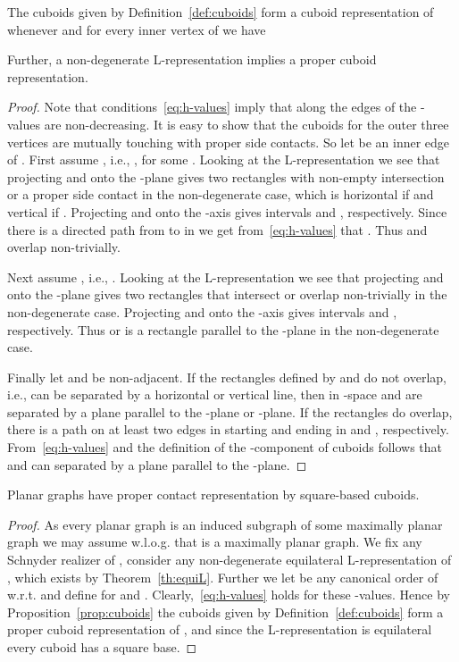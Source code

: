 \documentclass{llncs}
\begin{document}
\begin{proposition}\label{prop:cuboids}
 The cuboids given by Definition~\ref{def:cuboids} form a cuboid representation of  whenever  and for every inner vertex  of  we have
 
Further, a non-degenerate L-representation implies a proper cuboid representation.
\end{proposition}

\begin{proof}
Note that conditions~\eqref{eq:h-values} imply that along the edges of  the -values are non-decreasing.
It is easy to show that the cuboids for the outer three vertices are mutually touching with proper side contacts. So let  be an inner edge of . First assume , i.e., , for some . Looking at the L-representation we see that projecting  and  onto the -plane gives two rectangles with non-empty intersection or a proper side contact in the non-degenerate case, which is horizontal if  and vertical if . Projecting  and  onto the -axis gives intervals  and , respectively. Since there is a directed path from  to  in  we get from~\eqref{eq:h-values} that . Thus  and  overlap non-trivially.
 
 Next assume , i.e., . Looking at the L-representation we see that projecting  and  onto the -plane gives two rectangles that intersect or overlap non-trivially in the non-degenerate case. Projecting  and  onto the -axis gives intervals  and , respectively. Thus  or is a rectangle parallel to the -plane in the non-degenerate case.
  
 Finally let  and  be non-adjacent. If the rectangles defined by  and  do not overlap, i.e., can be separated by a horizontal or vertical line, then in -space  and  are separated by a plane parallel to the -plane or -plane. If the rectangles do overlap, there is a path on at least two edges in  starting and ending in  and , respectively. From~\eqref{eq:h-values} and the definition of the -component of cuboids follows that  and  can separated by a plane parallel to the -plane. 
\end{proof}

\begin{theorem}\label{thm:square-based}
 Planar graphs have proper contact representation by square-based cuboids.
\end{theorem}
\begin{proof}
 As every planar graph is an induced subgraph of some maximally planar graph we may assume w.l.o.g. that  is a maximally planar graph. We fix any Schnyder realizer  of , consider any non-degenerate equilateral L-re\-pre\-sen\-ta\-tion of , which exists by Theorem~\ref{th:equiL}. Further we let  be any canonical order of  w.r.t.  and define  for  and . Clearly,~\eqref{eq:h-values} holds for these -values. Hence by Proposition~\ref{prop:cuboids} the cuboids given by Definition~\ref{def:cuboids} form a proper cuboid representation of , and since the L-representation is equilateral every cuboid has a square base.
\end{proof}
 
\end{document}
